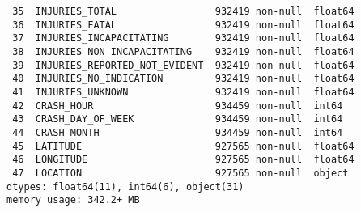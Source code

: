 \documentclass[12pt]{article}
\begin{document}
{\begin{verbatim}
 35  INJURIES_TOTAL                 932419 non-null  float64
 36  INJURIES_FATAL                 932419 non-null  float64
 37  INJURIES_INCAPACITATING        932419 non-null  float64
 38  INJURIES_NON_INCAPACITATING    932419 non-null  float64
 39  INJURIES_REPORTED_NOT_EVIDENT  932419 non-null  float64
 40  INJURIES_NO_INDICATION         932419 non-null  float64
 41  INJURIES_UNKNOWN               932419 non-null  float64
 42  CRASH_HOUR                     934459 non-null  int64  
 43  CRASH_DAY_OF_WEEK              934459 non-null  int64  
 44  CRASH_MONTH                    934459 non-null  int64  
 45  LATITUDE                       927565 non-null  float64
 46  LONGITUDE                      927565 non-null  float64
 47  LOCATION                       927565 non-null  object 
dtypes: float64(11), int64(6), object(31)
memory usage: 342.2+ MB

\end{verbatim}}
\end{document}
